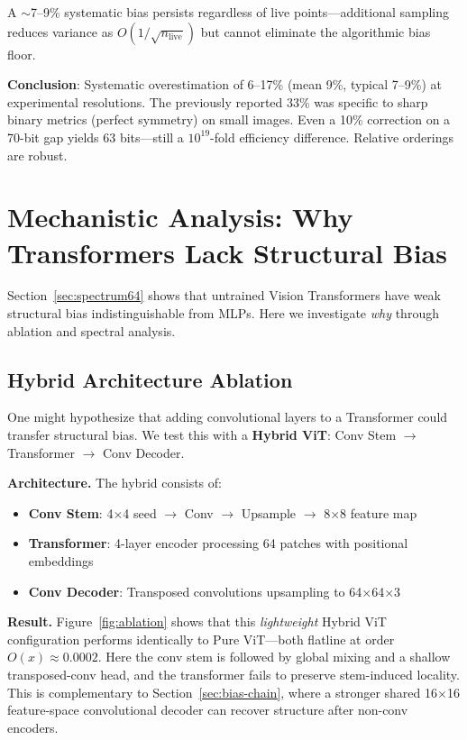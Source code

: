 A $\sim$7--9\% systematic bias persists regardless of live points---additional sampling reduces variance as $O(1/\sqrt{n_{\text{live}}})$ but cannot eliminate the algorithmic bias floor.

\textbf{Conclusion}: Systematic overestimation of 6--17\% (mean 9\%, typical 7--9\%) at experimental resolutions. The previously reported 33\% was specific to sharp binary metrics (perfect symmetry) on small images. Even a 10\% correction on a 70-bit gap yields 63 bits---still a $10^{19}$-fold efficiency difference. Relative orderings are robust.




\section{Mechanistic Analysis: Why Transformers Lack Structural Bias}
\label{app:mechanism}

Section~\ref{sec:spectrum64} shows that untrained Vision Transformers have weak structural bias indistinguishable from MLPs. Here we investigate \emph{why} through ablation and spectral analysis.

\subsection{Hybrid Architecture Ablation}

One might hypothesize that adding convolutional layers to a Transformer could transfer structural bias. We test this with a \textbf{Hybrid ViT}: Conv Stem $\to$ Transformer $\to$ Conv Decoder.

\textbf{Architecture.} The hybrid consists of:
\begin{itemize}
    \item \textbf{Conv Stem}: 4$\times$4 seed $\to$ Conv $\to$ Upsample $\to$ 8$\times$8 feature map
    \item \textbf{Transformer}: 4-layer encoder processing 64 patches with positional embeddings
    \item \textbf{Conv Decoder}: Transposed convolutions upsampling to 64$\times$64$\times$3
\end{itemize}

\textbf{Result.} Figure~\ref{fig:ablation} shows that this \emph{lightweight} Hybrid ViT configuration performs identically to Pure ViT---both flatline at order $O(x) \approx 0.0002$. Here the conv stem is followed by global mixing and a shallow transposed-conv head, and the transformer fails to preserve stem-induced locality. This is complementary to Section~\ref{sec:bias-chain}, where a stronger shared 16$\times$16 feature-space convolutional decoder can recover structure after non-conv encoders.

